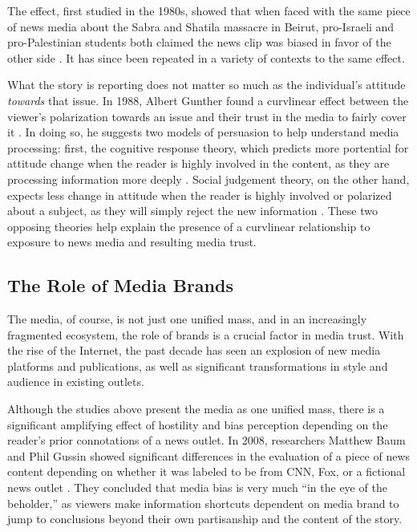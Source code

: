 The effect, first studied in the 1980s, showed that when faced with the same piece of news media about the Sabra and Shatila massacre in Beirut, pro-Israeli and pro-Palestinian students both claimed the news clip was biased in favor of the other side 
 \cite{vallone1985hostile}. It has since been repeated in a variety of contexts to the same effect.

What the story is reporting does not matter so much as the individual's attitude \emph{towards} that issue. In 1988, Albert Gunther found a curvlinear effect between the viewer's polarization towards an issue and their trust in the media to fairly cover it \cite{gunther1988attitude}. In doing so, he suggests two models of persuasion to help understand media processing: first, the cognitive response theory, which predicts more portential for attitude change when the reader is highly involved in the content, as they are processing information more deeply \cite{cacioppo1979effects}. Social judgement theory, on the other hand, expects less change in attitude when the reader is highly involved or polarized about a subject, as they will simply reject the new information \cite{sherif1961social}. These two opposing theories help explain the presence of a curvlinear relationship to exposure to news media and resulting media trust.

 

\subsection{The Role of Media Brands}

The media, of course, is not just one unified mass, and in an increasingly fragmented ecosystem, the role of brands is a crucial factor in media trust. With the rise of the Internet, the past decade has seen an explosion of new media platforms and publications, as well as significant transformations in style and audience in existing outlets.

Although the studies above present the media as one unified mass, there is a significant amplifying effect of hostility and bias perception depending on the reader's prior connotations of a news outlet. In 2008, researchers Matthew Baum and Phil Gussin showed significant differences in the evaluation of a piece of news content depending on whether it was labeled to be from CNN, Fox, or a fictional news outlet \cite{baum2008eye}. They concluded that media bias is very much ``in the eye of the beholder,'' as viewers make information shortcuts dependent on media brand to jump to conclusions beyond their own partisanship and the content of the story. 

